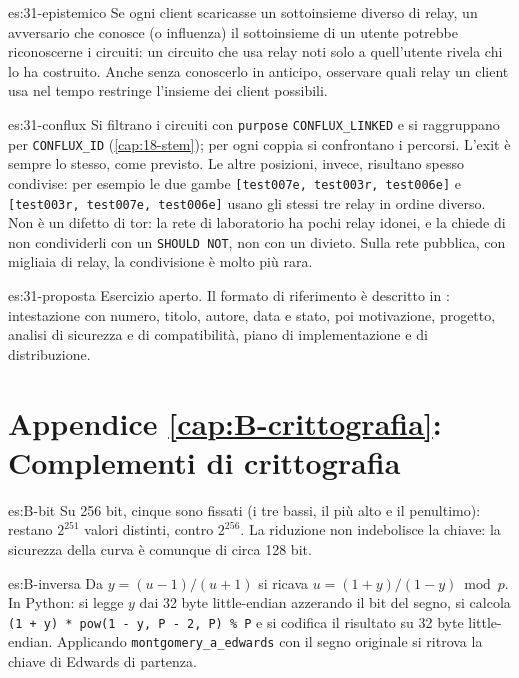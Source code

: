 \begin{soluzione}{es:31-epistemico}
Se ogni client scaricasse un sottoinsieme diverso di relay, un avversario che conosce (o influenza) il sottoinsieme di un utente potrebbe riconoscerne i circuiti: un circuito che usa relay noti solo a quell'utente rivela chi lo ha costruito. Anche senza conoscerlo in anticipo, osservare quali relay un client usa nel tempo restringe l'insieme dei client possibili.
\end{soluzione}

\begin{soluzione}{es:31-conflux}
Si filtrano i circuiti con \texttt{purpose} \texttt{CONFLUX\_LINKED} e si raggruppano per \texttt{CONFLUX\_ID} (\cref{cap:18-stem}); per ogni coppia si confrontano i percorsi. L'exit è sempre lo stesso, come previsto. Le altre posizioni, invece, risultano spesso condivise: per esempio le due gambe \texttt{[test007e, test003r, test006e]} e \texttt{[test003r, test007e, test006e]} usano gli stessi tre relay in ordine diverso. Non è un difetto di tor: la rete di laboratorio ha pochi relay idonei, e la  chiede di non condividerli con un \texttt{SHOULD NOT}, non con un divieto. Sulla rete pubblica, con migliaia di relay, la condivisione è molto più rara.
\end{soluzione}

\begin{soluzione}{es:31-proposta}
Esercizio aperto. Il formato di riferimento è descritto in : intestazione con numero, titolo, autore, data e stato, poi motivazione, progetto, analisi di sicurezza e di compatibilità, piano di implementazione e di distribuzione.
\end{soluzione}

\section*{Appendice \ref{cap:B-crittografia}: Complementi di crittografia}

\begin{soluzione}{es:B-bit}
Su 256 bit, cinque sono fissati (i tre bassi, il più alto e il penultimo): restano $2^{251}$ valori distinti, contro $2^{256}$. La riduzione non indebolisce la chiave: la sicurezza della curva è comunque di circa 128 bit.
\end{soluzione}

\begin{soluzione}{es:B-inversa}
Da $y = (u-1)/(u+1)$ si ricava $u = (1+y)/(1-y) \bmod p$. In Python: si legge $y$ dai 32 byte little-endian azzerando il bit del segno, si calcola \texttt{(1 + y) * pow(1 - y, P - 2, P) \% P} e si codifica il risultato su 32 byte little-endian. Applicando \texttt{montgomery\_a\_edwards} con il segno originale si ritrova la chiave di Edwards di partenza.
\end{soluzione}

